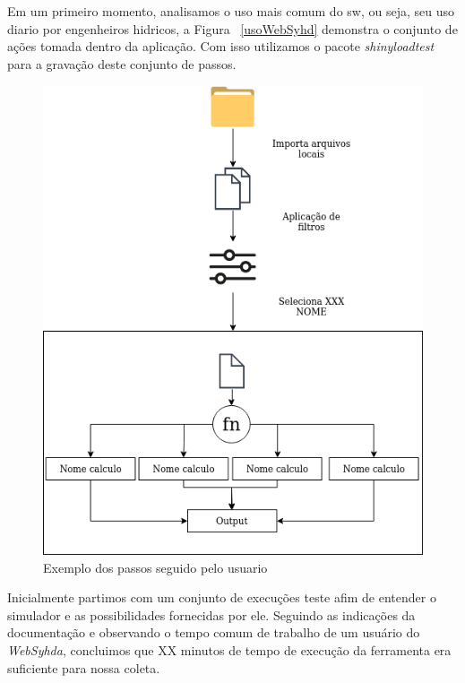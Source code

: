 \documentclass[12pt,english,brazil]{article}
\begin{document}
Em um primeiro momento, analisamos o uso mais comum do sw, ou seja, seu uso diario por engenheiros hidricos, a Figura ~\ref{usoWebSyhd} demonstra o conjunto de ações tomada dentro da aplicação. Com isso utilizamos o pacote \emph{shinyloadtest} para a gravação deste conjunto de passos. 

\begin{figure}[htbp]
  \centering 
  \includegraphics[scale=.4]{paperWSCAD2021/figures/usoWebSyhda.png}
  \caption{Exemplo dos passos seguido pelo usuario}
  \label{usoWebSyhda}
\end{figure}

Inicialmente partimos com um conjunto de execuções teste afim de entender o simulador e as possibilidades fornecidas por ele. Seguindo as indicações da documentação e observando o tempo comum de trabalho de um usuário do \emph{WebSyhda}, concluimos que %
XX minutos de tempo de execução da ferramenta era suficiente para nossa coleta.


\end{document}
